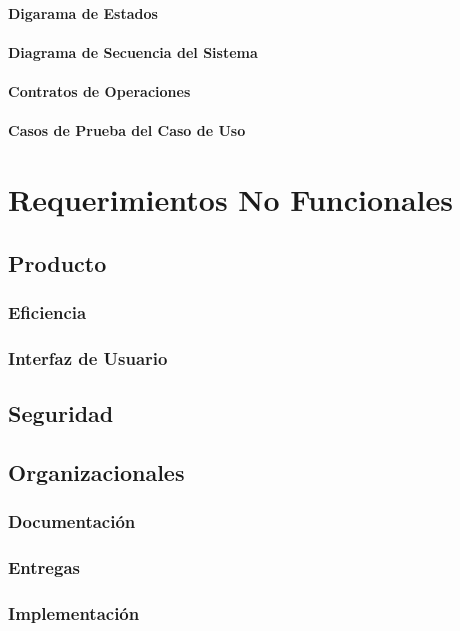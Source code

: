 \documentclass[12pt]{article}
\begin{document}
\paragraph{Digarama de Estados}
\paragraph{Diagrama de Secuencia del Sistema}
\paragraph{Contratos de Operaciones}
\paragraph{Casos de Prueba del Caso de Uso}


\section{Requerimientos No Funcionales}

\subsection{Producto}
\subsubsection{Eficiencia}
\subsubsection{Interfaz de Usuario}
\subsection{Seguridad}

\subsection{Organizacionales}
\subsubsection{Documentaci\'on}
\subsubsection{Entregas}
\subsubsection{Implementaci\'on}
\end{document}
